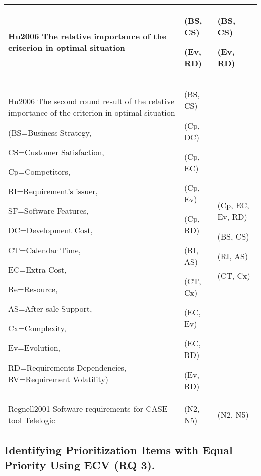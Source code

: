 \begin{table*}
\begin{tabular}{
|>{\centering}p{}
|>{\centering}p{}
|>{\centering}p{}|}
Hu2006 \citep{Hu2006} The relative importance of the criterion in optimal situation & (BS, CS) 

(Ev, RD) & (BS, CS) 

(Ev, RD)\tabularnewline
\hline 

Hu2006 \citep{Hu2006} The second round result of the relative importance of the criterion
in optimal situation

(BS=Business Strategy,

CS=Customer Satisfaction,

Cp=Competitors,

RI=Requirement's issuer,

SF=Software Features,

DC=Development Cost,

CT=Calendar Time,

EC=Extra Cost,

Re=Resource,

AS=After-sale Support,

Cx=Complexity,

Ev=Evolution,

RD=Requirements Dependencies, RV=Requirement Volatility) & (BS, CS)

(Cp, DC)

(Cp, EC)

(Cp, Ev) 

(Cp, RD)

(RI, AS) 

(CT, Cx) 

(EC, Ev) 

(EC, RD)

(Ev, RD) & (Cp, EC, Ev, RD)

(BS, CS)

(RI, AS) 

(CT, Cx) \tabularnewline
\hline 
Regnell2001 \citep{Regnell2001} Software requirements for CASE tool Telelogic & (N2, N5) & (N2, N5)\tabularnewline
\hline
\end{tabular}%
\end{table*}


\subsection{Identifying Prioritization Items with Equal Priority Using ECV (RQ 3).\label{rq3}}

